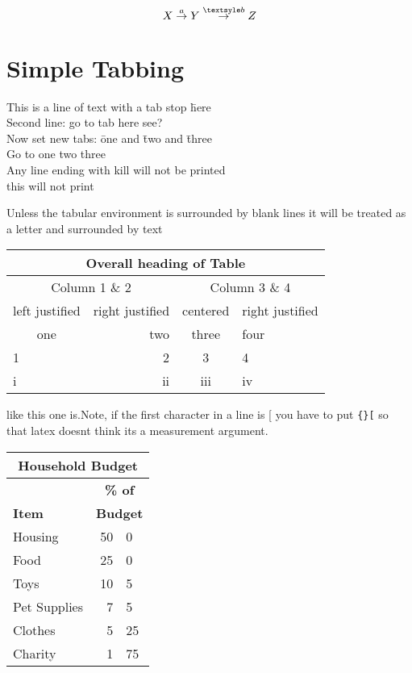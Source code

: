 \documentclass[12pt,twoside,leqno]{article}%
\begin{document}
\[
X\stackrel{a}{\rightarrow} Y \stackrel{\textsyle b}{\rightarrow} Z
\]
\section{Simple Tabbing}
\begin{tabbing}
This is a line of text with a tab stop \= here \\
Second line: go to tab \>here see? \\
Now set new tabs: \= one and \=two and \=three \\
Go to \>one \>two \>three\\
Any line ending with kill will not be printed\\
this will not print \kill
\end{tabbing}

Unless the tabular environment is surrounded by blank lines it will be treated as a letter and surrounded by text
\begin{tabular}{|lr|cp{.5in}|}\hline
\multicolumn{4}{c}{Overall heading of Table}\\\hline
\multicolumn{2}{c}{Column 1 \& 2}& \multicolumn{2}{c}{Column 3 \& 4}\\\hline
left justified & right justified & centered & right justified\\[.25in]\hline\hline
\multicolumn{1}{c}{one} & two & three & four\\ \cline{2-4}%
1&2&3&4\\
i&ii&iii&iv
\end{tabular}like this one is.Note, if the first character in a line is [ you have to put \verb!{}[! so that latex doesnt think its a measurement argument.

\begin{center}
\begin{tabular}{|l|r@{.}l|}\hline
\multicolumn{3}{|c|}{\bf Household Budget}\\\hline\hline & \multicolumn{2}{c|}{\bf \% of }\\
\bf Item & \multicolumn{2}{c|}{\bf Budget}\\ \hline
Housing & 50 & 0 \\
Food & 25 & 0 \\
Toys & 10 & 5 \\
Pet Supplies & 7& 5\\
Clothes & 5 & 25\\
Charity & 1 & 75 \\ \hline
\end{tabular}
\end{center}
\end{document}

